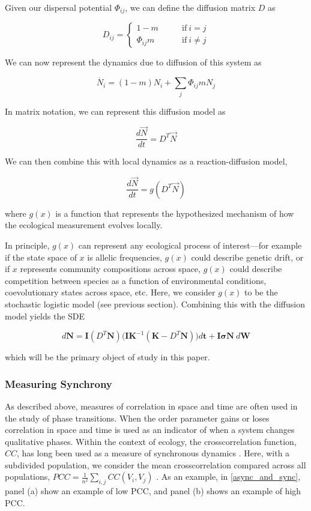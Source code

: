 \documentclass[]{article}
\begin{document}
Given our dispersal potential $\Phi_{ij}$, we can define the
diffusion matrix \( D \) as

\[D_{ij} = \begin{cases} 1 - m \quad\quad &\text{if}\ i = j \\ \Phi_{ij}m & \text{if}\ i \neq j\end{cases}\]

We can now represent the
dynamics due to diffusion of this system as

\[\dot{N_i}=(1-m)N_i+ \sum_j \Phi_{ij}mN_j\]

In matrix notation, we can represent this diffusion model as

\[\frac{d\vec{N}}{dt}=D^T\vec{N}\]

We can then combine this with local dynamics as a reaction-diffusion
model,

\[\frac{d\vec{N}}{dt} = g(D^T \vec{N})\]

where \(g(x)\) is a function that represents the hypothesized mechanism
of how the ecological measurement evolves locally.


In principle, \(g(x)\) can represent any ecological process of
interest---for example if the state space of \(x\) is allelic
frequencies, \(g(x)\) could describe genetic drift, or if \(x\)
represents community compositions across space, \(g(x)\) could describe
competition between species as a function of environmental conditions,
coevolutionary states across space, etc. Here, we consider \(g(x)\) to
be the stochastic logistic model (see previous section). Combining this
with the diffusion model yields the SDE

\begin{equation} \label{diffusion_model}
  d \boldsymbol{N} = \boldsymbol{I} (D^T \boldsymbol{N})\bigg(\boldsymbol{I}\boldsymbol{K}^{-1}(\boldsymbol{K}-D^T \boldsymbol{N})\bigg) d\boldsymbol{t} + \boldsymbol{I}\boldsymbol{\sigma} \boldsymbol{N} \ d\boldsymbol{W}
\end{equation}

which will be the primary object of study in this paper.

\hypertarget{measuring-synchrony}{%
\subsubsection{Measuring Synchrony}\label{measuring-synchrony}}

As described above, measures of correlation in space and time are often
used in the study of phase transitions. When the order parameter gains
or loses correlation in space and time is used as an indicator of when a
system changes qualitative phases. Within the context of ecology, the
crosscorrelation function, \(CC\), has long been used as a measure of
synchronous dynamics \cite{liebhold_spatial_2004}. Here, with a subdivided
population, we consider the mean crosscorrelation compared across all
populations, \({PCC}=\frac{1}{n^2}\sum_{i,j} CC(V_i,V_j)\) . As an
example, in \ref{async_and_sync}, panel (a) show an example of low PCC,
and panel (b) shows an example of high PCC.
\end{document}
